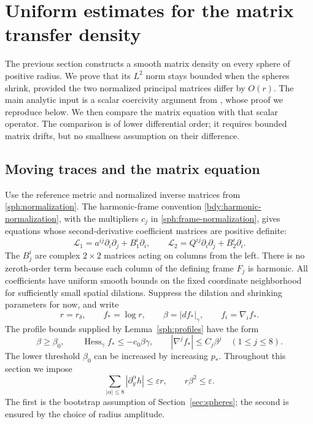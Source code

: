 \section{Uniform estimates for the matrix transfer density}
\label{ang:section}\label{sec:angular}

The previous section constructs a smooth matrix density on every sphere
of positive radius.  We prove that its $L^2$ norm stays bounded when the
spheres shrink, provided the two normalized principal matrices differ by
$O(r)$.  The main analytic input is a scalar coercivity argument from
\citet[Section~5]{ScalarCompanion2026}, whose proof we reproduce below.
We then compare the matrix equation with that scalar operator.  The
comparison is of lower differential order; it requires bounded matrix
drifts, but no smallness assumption on their difference.

\subsection{Moving traces and the matrix equation}

Use the reference metric and normalized inverse matrices from
\eqref{sph:normalization}.  The harmonic-frame convention
\eqref{bdy:harmonic-normalization}, with the multipliers $c_j$ in
\eqref{sph:frame-normalization}, gives equations whose second-derivative
coefficient matrices are positive definite:
\begin{equation}\label{ang:frame-equations}
 \mathcal L_1=a^{ij}\partial_i\partial_j+B_1^i\partial_i,
 \qquad
 \mathcal L_2=Q^{ij}\partial_i\partial_j+B_2^i\partial_i.
\end{equation}
The $B_j^i$ are complex $2\times2$ matrices acting on columns from the
left.  There is no zeroth-order term because each column of the defining
frame $F_j$ is harmonic.  All coefficients have uniform smooth bounds
on the fixed coordinate neighborhood for sufficiently small spatial
dilations.  Suppress the dilation and shrinking parameters for now, and
write
\[
 r=r_\delta,\qquad f_*=\log r,\qquad
 \beta=|df_*|_\gamma,\qquad f_i=\nabla_i f_*.
\]
The profile bounds supplied by Lemma~\ref{sph:profiles} have the form
\begin{equation}\label{ang:profile-bounds}
 \beta\ge\beta_0,\qquad
 \operatorname{Hess}_\gamma f_*\le-c_0\beta\gamma,\qquad
 |\nabla^j f_*|\le C_j\beta^j\quad(1\le j\le8).
\end{equation}
The lower threshold $\beta_0$ can be increased by increasing $p_*$.
Throughout this section we impose
\begin{equation}\label{ang:smallness}
 \sum_{|\alpha|\le8}|\partial_y^\alpha h|\le\varepsilon r,
 \qquad r\beta^2\le\varepsilon.
\end{equation}
The first is the bootstrap assumption of Section~\ref{sec:spheres};
the second is ensured by the choice of radius amplitude.

